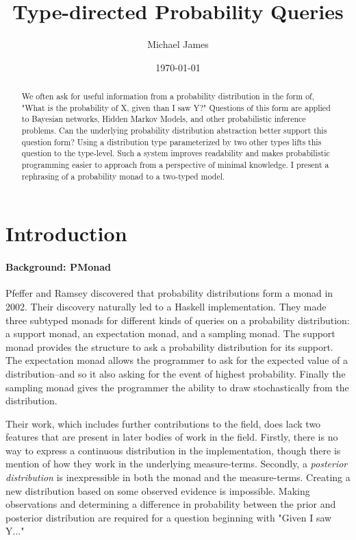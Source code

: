 \documentclass[10pt,twocolumn]{article}
\title{Type-directed Probability Queries}
\author{Michael James}
\date{\today}
\begin{document}
\maketitle
\lstset{language=Haskell} 

\begin{abstract}
We often ask for useful information from a probability distribution in the form of, "What is the probability of X, given than I saw Y?" Questions of this form are applied to Bayesian networks, Hidden Markov Models, and other probabilistic inference problems. Can the underlying probability distribution abstraction better support this question form? Using a distribution type parameterized by two other types lifts this question to the type-level. Such a system improves readability and makes probabilistic programming easier to approach from a perspective of minimal knowledge. I present a rephrasing of a probability monad to a two-typed model.
\end{abstract}

\section{Introduction}
\paragraph{Background: PMonad}
Pfeffer and Ramsey discovered that probability distributions form a monad in 2002. Their discovery naturally led to a Haskell implementation. They made three subtyped monads for different kinds of queries on a probability distribution: a support monad, an expectation monad, and a sampling monad. The support monad provides the structure to ask a probability distribution for its support. The expectation monad allows the programmer to ask for the expected value of a distribution--and so it also asking for the event of highest probability. Finally the sampling monad gives the programmer the ability to draw stochastically from the distribution.

Their work, which includes further contributions to the field, does lack two features that are present in later bodies of work in the field. Firstly, there is no way to express a continuous distribution in the implementation, though there is mention of how they work in the underlying measure-terms. Secondly, a \textit{posterior distribution} is inexpressible in both the monad and the measure-terms. Creating a new distribution based on some observed evidence is impossible. Making observations and determining a difference in probability between the prior and posterior distribution are required for a question beginning with "Given I saw Y..."
\end{document}
